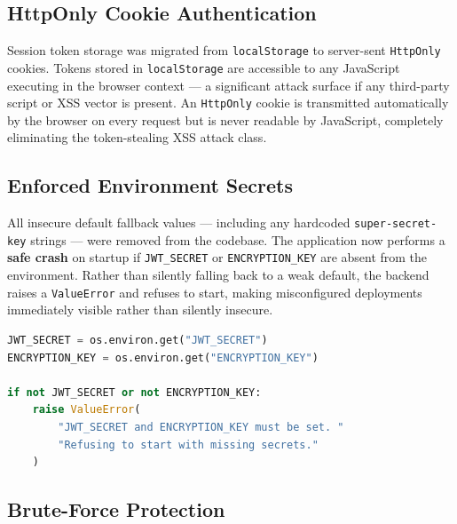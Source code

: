 \documentclass[12pt, a4paper]{article}
\begin{document}
\subsection{HttpOnly Cookie Authentication}

Session token storage was migrated from \texttt{localStorage} to server-sent \texttt{HttpOnly} cookies. Tokens stored in \texttt{localStorage} are accessible to any JavaScript executing in the browser context — a significant attack surface if any third-party script or XSS vector is present. An \texttt{HttpOnly} cookie is transmitted automatically by the browser on every request but is never readable by JavaScript, completely eliminating the token-stealing XSS attack class.

\subsection{Enforced Environment Secrets}

All insecure default fallback values — including any hardcoded \texttt{super-secret-key} strings — were removed from the codebase. The application now performs a \textbf{safe crash} on startup if \texttt{JWT\_SECRET} or \texttt{ENCRYPTION\_KEY} are absent from the environment. Rather than silently falling back to a weak default, the backend raises a \texttt{ValueError} and refuses to start, making misconfigured deployments immediately visible rather than silently insecure.

\begin{lstlisting}[language=Python, caption={Enforced secret validation on startup}]
JWT_SECRET = os.environ.get("JWT_SECRET")
ENCRYPTION_KEY = os.environ.get("ENCRYPTION_KEY")

if not JWT_SECRET or not ENCRYPTION_KEY:
    raise ValueError(
        "JWT_SECRET and ENCRYPTION_KEY must be set. "
        "Refusing to start with missing secrets."
    )
\end{lstlisting}

\subsection{Brute-Force Protection}
\end{document}
